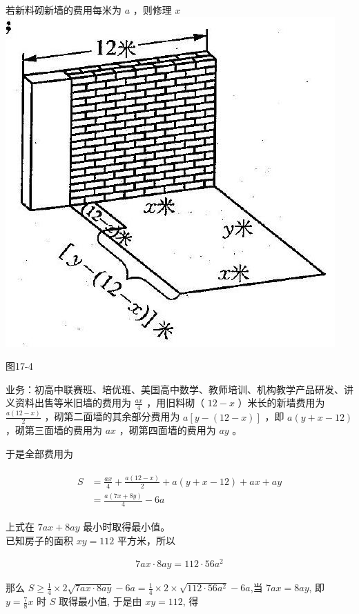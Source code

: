 \documentclass[10pt]{article}
\begin{document}
若新料砌新墙的费用每米为 $a$ ，则修理 $x$\\
\includegraphics[max width=\textwidth, center]{2024_10_30_26b590fd1106d28139f0g-115}

图17-4

业务：初高中联赛班、培优班、美国高中数学、教师培训、机构教学产品研发、讲义资料出售等米旧墙的费用为 $\frac{a x}{4}$ ，用旧料砌（ $12-x$ ）米长的新墙费用为 $\frac{a(12-x)}{2}$ ，砌第二面墙的其余部分费用为 $a[y-(12-x)]$ ，即 $a(y+x-12)$ ，砌第三面墙的费用为 $a x$ ，砌第四面墙的费用为 $a y$ 。

于是全部费用为

\begin{align*}
\begin{aligned}
S & =\frac{a x}{4}+\frac{a(12-x)}{2}+a(y+x-12)+a x+a y \\
& =\frac{a(7 x+8 y)}{4}-6 a
\end{aligned}
\end{align*}

上式在 $7 a x+8 a y$ 最小时取得最小值。\\
已知房子的面积 $x y=112$ 平方米，所以

\begin{align*}
7 a x \cdot 8 a y=112 \cdot 56 a^{2}
\end{align*}

那么 $S \geqslant \frac{1}{4} \times 2 \sqrt{7 a x \cdot 8 a y}-6 a=\frac{1}{4} \times 2 \times \sqrt{112 \cdot 56 a^{2}}-6 a$,当 $7 a x=8 a y$, 即 $y=\frac{7}{8} x$ 时 $S$ 取得最小值, 于是由 $x y=112$, 得
\end{document}
